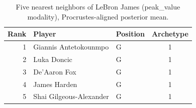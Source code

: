 \begin{table}[htbp]
  \centering\small
  \begin{tabular}{rllc}
    \toprule
    Rank & Player & Position & Archetype \\
    \midrule
    1 & Giannis Antetokounmpo & G & 1 \\
    2 & Luka Doncic & G & 1 \\
    3 & De'Aaron Fox & G & 1 \\
    4 & James Harden & G & 1 \\
    5 & Shai Gilgeous-Alexander & G & 1 \\
    \bottomrule
  \end{tabular}
  \caption{Five nearest neighbors of LeBron James (peak_value modality), Procrustes-aligned posterior mean.}
  \label{tab:LeBron_James_neighbors_peak_value}
\end{table}


